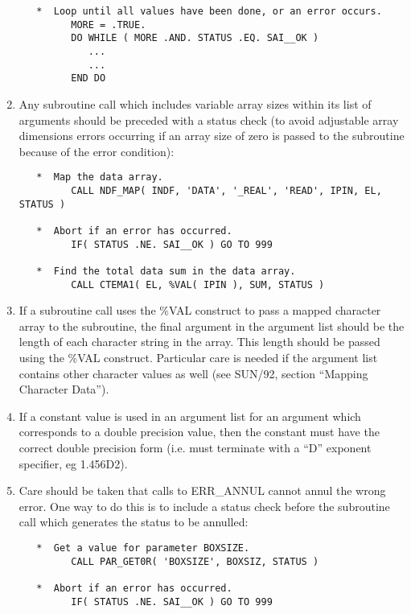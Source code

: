 \begin{enumerate}
\small
\begin{verbatim}
   *  Loop until all values have been done, or an error occurs.
         MORE = .TRUE.
         DO WHILE ( MORE .AND. STATUS .EQ. SAI__OK ) 
            ...
            ...
         END DO
\end{verbatim}
\normalsize

\item Any subroutine call which includes variable array sizes within its
list of arguments should be preceded with a status check (to avoid adjustable 
array dimensions errors occurring if an array size of zero is passed to the 
subroutine because of the error condition):

\small
\begin{verbatim}
   *  Map the data array.
         CALL NDF_MAP( INDF, 'DATA', '_REAL', 'READ', IPIN, EL, STATUS )

   *  Abort if an error has occurred.
         IF( STATUS .NE. SAI__OK ) GO TO 999

   *  Find the total data sum in the data array.
         CALL CTEMA1( EL, %VAL( IPIN ), SUM, STATUS )
\end{verbatim}
\normalsize

\item If a subroutine call uses the {\small \%VAL} construct to pass a mapped
character array to the subroutine, the final argument in the argument list
should be the length of each character string in the array. This length should
be passed using the {\small \%VAL} construct. Particular care is needed if the
argument list contains other character values as well (see SUN/92, section
``Mapping Character Data''). 

\item If a constant value is used in an argument list for an argument which 
corresponds to a double precision value, then the constant must have the correct 
double precision form (i.e. must terminate with a ``D'' exponent 
specifier, eg 1.456D2).

\item Care should be taken that calls to {\small ERR\_ANNUL} cannot annul the 
wrong error. One way to do this is to include a status check before 
the subroutine call which generates the status to be annulled:

\small
\begin{verbatim}
   *  Get a value for parameter BOXSIZE.
         CALL PAR_GET0R( 'BOXSIZE', BOXSIZ, STATUS )

   *  Abort if an error has occurred.
         IF( STATUS .NE. SAI__OK ) GO TO 999


\end{verbatim}
\end{enumerate}
